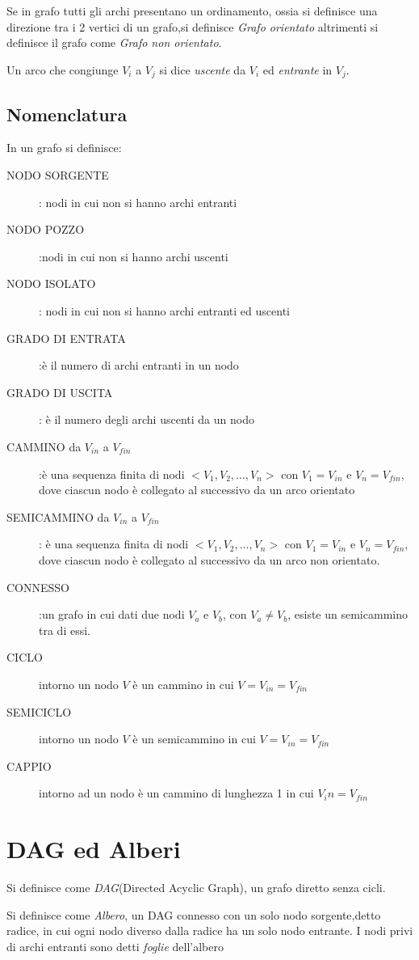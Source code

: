 Se in grafo tutti gli archi presentano un ordinamento, ossia si definisce una direzione
tra i 2 vertici di un grafo,si definisce \emph{Grafo orientato}
altrimenti si definisce il grafo come \emph{Grafo non orientato}.

Un arco che congiunge $V_i$ a $V_j$ si dice \emph{uscente} da $V_i$ ed \emph{entrante} in $V_j$.

\subsection{Nomenclatura}
In un grafo si definisce:
\begin{description}
    \item[NODO SORGENTE]: nodi in cui non si hanno archi entranti
    \item[NODO POZZO]:nodi in cui non si hanno archi uscenti
    \item[NODO ISOLATO]: nodi in cui non si hanno archi entranti ed uscenti
    \item[GRADO DI ENTRATA]:è il numero di archi entranti in un nodo
    \item[GRADO DI USCITA]: è il numero degli archi uscenti da un nodo
    \item[CAMMINO da $V_{in}$ a $V_{fin}$]:è una sequenza finita di nodi $<V_1,V_2,\dots,V_n>$
     con $V_1 = V_{in}$ e $V_n = V_{fin}$, dove ciascun nodo è collegato al successivo da un arco orientato
    \item[SEMICAMMINO da $V_{in}$ a $V_{fin}$]: è una sequenza finita di nodi
     $<V_1,V_2,\dots,V_n>$ con $V_1 = V_{in}$ e $V_n = V_{fin}$, dove ciascun nodo
     è collegato al successivo da un arco non orientato.
    \item[CONNESSO]:un grafo in cui dati due nodi $V_a$ e $V_b$, con $V_a \neq V_b$,
                    esiste un semicammino tra di essi.
    \item[CICLO]intorno un nodo $V$ è un cammino in cui $V = V_{in} = V_{fin}$
    \item[SEMICICLO]intorno un nodo $V$ è un semicammino in cui $V = V_{in} = V_{fin}$
    \item[CAPPIO]intorno ad un nodo è un cammino di lunghezza 1 in cui $V_in = V_{fin}$
\end{description}


\section{DAG ed Alberi}
Si definisce come \emph{DAG}(Directed Acyclic Graph), un grafo diretto senza cicli.

Si definisce come \emph{Albero}, un DAG connesso con un solo nodo sorgente,detto  radice,
in cui ogni nodo diverso dalla radice ha un solo nodo entrante.\newline
I nodi privi di archi entranti sono detti \emph{foglie} dell'albero

